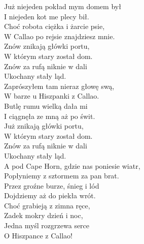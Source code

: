 \begin{multicols}{2}
Już niejeden pokład mym domem był \\
I niejeden kot me plecy bił. \\
Choć robota ciężka i żarcie psie, \\
W Callao po rejsie znajdziesz mnie. \\

Znów znikają główki portu, \\
W którym stary został dom. \\
Znów za rufą niknie w dali \\
Ukochany stały ląd. \\

Zaprószyłem tam nieraz głowę swą, \\
W barze u Hiszpanki z Callao. \\
Butlę rumu wielką dała mi \\
I ciągnęła ze mną aż po świt. \\

Już znikają główki portu, \\
W którym stary został dom. \\
Znów za rufą niknie w dali \\
Ukochany stały ląd. \\

A pod Cape Horn, gdzie nas poniesie wiatr, \\
Popłyniemy z sztormem za pan brat. \\
Przez groźne burze, śnieg i lód \\
Dojdziemy aż do piekła wrót. \\

Choć grabieją z zimna ręce, \\
Zadek mokry dzień i noc, \\
Jedna myśl rozgrzewa serce  \\
O Hiszpance z Callao!
\end{multicols}